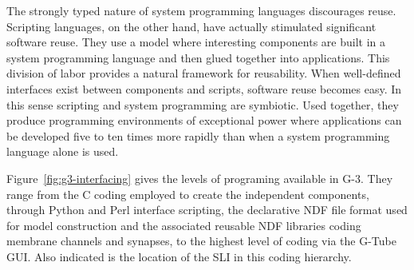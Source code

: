 \documentclass[10pt]{article}
\begin{document}


The strongly typed nature of system programming languages discourages
reuse. Scripting languages, on the other hand, have actually
stimulated significant software reuse. They use a model where
interesting components are built in a system programming language and
then glued together into applications.
This division of labor provides a natural framework for reusability.
When well-defined interfaces exist between components and scripts, software reuse becomes easy.
In this sense scripting and system programming are symbiotic. Used
together, they produce programming environments of exceptional power where applications can be developed
five to ten times more rapidly than when a system programming language alone is used.


Figure~\ref{fig:g3-interfacing} gives the levels of programing available in G-3. They range from the C coding employed to create the independent components, through Python and Perl interface scripting, the declarative NDF file format used for model construction and the associated reusable NDF libraries coding membrane channels and synapses, to the highest level of coding via the G-Tube GUI. Also indicated is the location of the SLI in this coding hierarchy.
\end{document}
